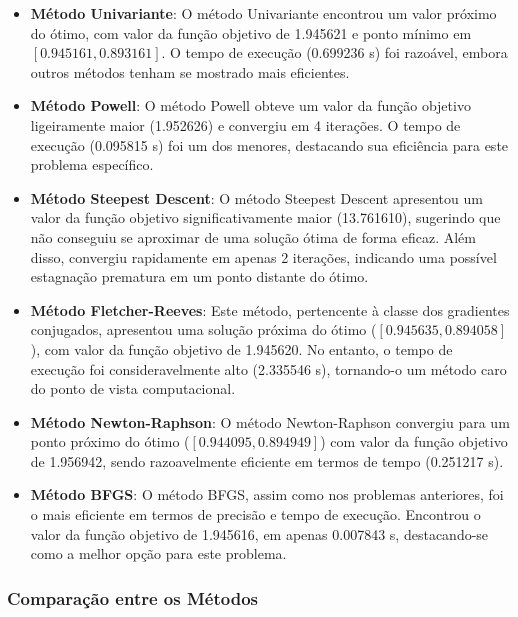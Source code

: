 \documentclass[a4paper, 12pt]{article}
\begin{document}
\begin{itemize}
    \item \textbf{Método Univariante}: O método Univariante encontrou um valor próximo do ótimo, com valor da função objetivo de 1.945621 e ponto mínimo em \([0.945161, 0.893161]\). O tempo de execução (0.699236 s) foi razoável, embora outros métodos tenham se mostrado mais eficientes.
    
    \item \textbf{Método Powell}: O método Powell obteve um valor da função objetivo ligeiramente maior (1.952626) e convergiu em 4 iterações. O tempo de execução (0.095815 s) foi um dos menores, destacando sua eficiência para este problema específico.

    \item \textbf{Método Steepest Descent}: O método Steepest Descent apresentou um valor da função objetivo significativamente maior (13.761610), sugerindo que não conseguiu se aproximar de uma solução ótima de forma eficaz. Além disso, convergiu rapidamente em apenas 2 iterações, indicando uma possível estagnação prematura em um ponto distante do ótimo.

    \item \textbf{Método Fletcher-Reeves}: Este método, pertencente à classe dos gradientes conjugados, apresentou uma solução próxima do ótimo (\([0.945635, 0.894058]\)), com valor da função objetivo de 1.945620. No entanto, o tempo de execução foi consideravelmente alto (2.335546 s), tornando-o um método caro do ponto de vista computacional.

    \item \textbf{Método Newton-Raphson}: O método Newton-Raphson convergiu para um ponto próximo do ótimo (\([0.944095, 0.894949]\)) com valor da função objetivo de 1.956942, sendo razoavelmente eficiente em termos de tempo (0.251217 s).

    \item \textbf{Método BFGS}: O método BFGS, assim como nos problemas anteriores, foi o mais eficiente em termos de precisão e tempo de execução. Encontrou o valor da função objetivo de 1.945616, em apenas 0.007843 s, destacando-se como a melhor opção para este problema.
\end{itemize}

\subsubsection{Comparação entre os Métodos}
\end{document}
